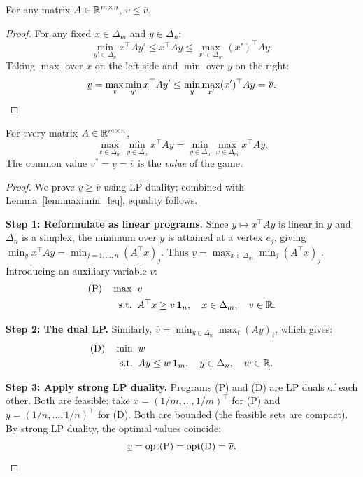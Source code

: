 \documentclass[11pt,a4paper]{article}
\begin{document}
\begin{lemma}
\label{lem:maximin_leq}
For any matrix $A \in \mathbb{R}^{m \times n}$, $\underline{v} \leq \overline{v}$.
\end{lemma}

\begin{proof}
For any fixed $x \in \Delta_m$ and $y \in \Delta_n$:
\[
    \min_{y' \in \Delta_n} x^\top A y' \leq x^\top A y
    \leq \max_{x' \in \Delta_m} (x')^\top A y.
\]
Taking $\max$ over $x$ on the left side and $\min$ over $y$ on the right:
\[
    \underline{v} = \max_x \min_{y'} x^\top A y'
    \leq \min_y \max_{x'} (x')^\top A y = \overline{v}. \qedhere
\]
\end{proof}

\begin{keyresult}
\begin{theorem}
\label{thm:minimax}
For every matrix $A \in \mathbb{R}^{m \times n}$,
\[
    \max_{x \in \Delta_m} \min_{y \in \Delta_n} x^\top A y
    = \min_{y \in \Delta_n} \max_{x \in \Delta_m} x^\top A y.
\]
The common value $v^* = \underline{v} = \overline{v}$ is the \emph{value}
of the game.
\end{theorem}
\end{keyresult}

\begin{proof}
We prove $\underline{v} \geq \overline{v}$ using LP duality; combined with
Lemma~\ref{lem:maximin_leq}, equality follows.

\textbf{Step 1: Reformulate as linear programs.}
Since $y \mapsto x^\top A y$ is linear in $y$ and $\Delta_n$ is a simplex,
the minimum over $y$ is attained at a vertex $e_j$, giving
$\min_y x^\top A y = \min_{j=1,\ldots,n} (A^\top x)_j$. Thus
$\underline{v} = \max_{x \in \Delta_m} \min_j (A^\top x)_j$. Introducing
an auxiliary variable $v$:
\begin{align}
    \text{(P)} \quad \max\;&\; v \notag \\
    \text{s.t.}\;&\; A^\top x \geq v\, \mathbf{1}_n, \quad
    x \in \Delta_m, \quad v \in \mathbb{R}.
    \label{eq:primal}
\end{align}

\textbf{Step 2: The dual LP.}
Similarly, $\overline{v} = \min_{y \in \Delta_n} \max_i (Ay)_i$, which
gives:
\begin{align}
    \text{(D)} \quad \min\;&\; w \notag \\
    \text{s.t.}\;&\; Ay \leq w\, \mathbf{1}_m, \quad
    y \in \Delta_n, \quad w \in \mathbb{R}.
    \label{eq:dual}
\end{align}

\textbf{Step 3: Apply strong LP duality.}
Programs (P) and (D) are LP duals of each other. Both are feasible: take
$x = (1/m, \ldots, 1/m)^\top$ for (P) and $y = (1/n, \ldots, 1/n)^\top$
for (D). Both are bounded (the feasible sets are compact). By strong LP
duality, the optimal values coincide:
\[
    \underline{v} = \text{opt(P)} = \text{opt(D)} = \overline{v}. \qedhere
\]
\end{proof}
\end{document}
